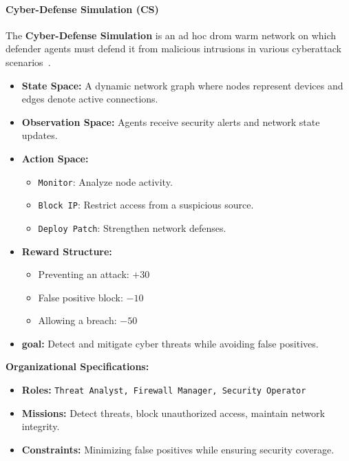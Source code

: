 \documentclass[pdflatex,sn-mathphys-num]{sn-jnl}%
\theoremstyle{thmstyleone}%
\theoremstyle{thmstyletwo}%
\theoremstyle{thmstylethree}%
\begin{document}
\paragraph{Cyber-Defense Simulation (CS)}
The \textbf{Cyber-Defense Simulation} is an ad hoc drom warm network on which defender agents must defend it from malicious intrusions in various cyberattack scenarios~\cite{Maxwell2021}. 

\begin{itemize}
    \item \textbf{State Space:} A dynamic network graph where nodes represent devices and edges denote active connections.
    \item \textbf{Observation Space:} Agents receive security alerts and network state updates.
    \item \textbf{Action Space:} 
    \begin{itemize}
        \item \texttt{Monitor}: Analyze node activity.
        \item \texttt{Block IP}: Restrict access from a suspicious source.
        \item \texttt{Deploy Patch}: Strengthen network defenses.
    \end{itemize}
    \item \textbf{Reward Structure:}
    \begin{itemize}
        \item Preventing an attack: $+30$
        \item False positive block: $-10$
        \item Allowing a breach: $-50$
    \end{itemize}
    \item \textbf{goal:} Detect and mitigate cyber threats while avoiding false positives.
\end{itemize}

\textbf{Organizational Specifications:} 
\begin{itemize}
    \item \textbf{Roles:} \texttt{Threat Analyst, Firewall Manager, Security Operator}
    \item \textbf{Missions:} Detect threats, block unauthorized access, maintain network integrity.
    \item \textbf{Constraints:} Minimizing false positives while ensuring security coverage.
\end{itemize}

\bigskip
\end{document}
